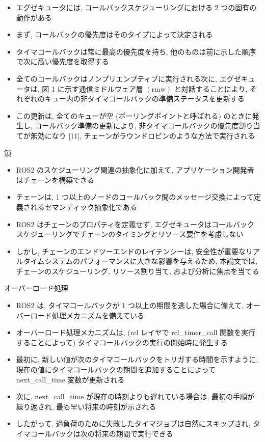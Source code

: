 \begin{frame}{}
    \begin{itemize}
        \item エグゼキュータには, コールバックスケジューリングにおける 2 つの固有の動作がある
\item まず, コールバックの優先度はそのタイプによって決定される
\item タイマコールバックは常に最高の優先度を持ち, 他のものは前に示した順序で次に高い優先度を取得する
\item 全てのコールバックはノンプリエンプティブに実行される次に, エグゼキュータは, 図 1 に示す通信ミドルウェア層 $(\mathrm{rmw})$ と対話することにより, それぞれのキュー内の非タイマコールバックの準備ステータスを更新する
\item この更新は, 全てのキューが空 (ポーリングポイントと呼ばれる) のときに発生し, コールバック準備の更新により, 非タイマコールバックの優先度割り当てが無効になり [11], チェーンがラウンドロビンのような方法で実行される
    \end{itemize}
\end{frame}

\begin{frame}{鎖}
    \begin{itemize}
        \item ROS2 のスケジューリング関連の抽象化に加えて, アプリケーション開発者はチェーンを構築できる
\item チェーンは, 1 つ以上のノードのコールバック間のメッセージ交換によって定義されるセマンティック抽象化である
\item ROS2 はチェーンのプロパティを定義せず, エグゼキュータはコールバックスケジューリングでチェーンのタイミングとリソース要件を考慮しない
\item しかし, チェーンのエンドツーエンドのレイテンシーは, 安全性が重要なリアルタイムシステムのパフォーマンスに大きな影響を与えるため, 本論文では, チェーンのスケジューリング, リソース割り当て, および分析に焦点を当てる
    \end{itemize}
\end{frame}

\begin{frame}{オーバーロード処理}
    \begin{itemize}
        \item ROS2 は, タイマコールバックが 1 つ以上の期間を逃した場合に備えて, オーバーロード処理メカニズムを備えている
\item オーバーロード処理メカニズムは, (rcl レイヤで rcl\_timer\_call 関数を実行することによって) タイマコールバックの実行の開始時に発生する
\item 最初に, 新しい値が次のタイマコールバックをトリガする時間を示すように, 現在の値にタイマコールバックの期間を追加することによって next\_call\_time 変数が更新される
\item 次に, next\_call\_time が現在の時刻よりも遅れている場合は, 最初の手順が繰り返され, 最も早い将来の時刻が示される
\item したがって, 過負荷のために失敗したタイマジョブは自然にスキップされ, タイマコールバックは次の将来の期間で実行できる
    \end{itemize}
\end{frame}

